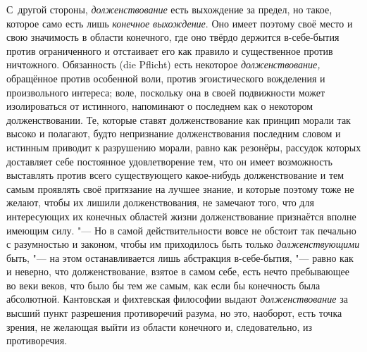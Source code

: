 С~другой стороны, {\em долженствование} есть выхождение
за предел, но такое, которое само есть лишь
{\em конечное выхождение}. Оно имеет поэтому своё место
и свою значимость в области конечного, где оно твёрдо держится в-себе-бытия
против ограниченного и отстаивает его как правило и существенное против
ничтожного. Обязанность (die Pflicht) есть некоторое
{\em долженствование,} обращённое против особенной
воли, против эгоистического вожделения и произвольного интереса; воле,
поскольку она в своей подвижности может изолироваться от истинного,
напоминают о последнем как о некотором долженствовании. Те, которые ставят
долженствование как принцип морали так высоко и полагают, будто непризнание
долженствования последним словом и истинным приводит к разрушению морали,
равно как резонёры, рассудок которых доставляет себе постоянное
удовлетворение тем, что он имеет возможность выставлять против всего
существующего какое-нибудь долженствование и тем самым проявлять своё
притязание на лучшее знание, и которые поэтому тоже не желают, чтобы их лишили
долженствования, не замечают того, что для интересующих их конечных
областей жизни долженствование признаётся вполне имеющим силу. "--- Но в самой
действительности вовсе не обстоит так печально с разумностью и законом,
чтобы им приходилось быть только {\em долженствующими}
быть, "--- на этом останавливается лишь абстракция в-себе-бытия, "--- равно как и
неверно, что долженствование, взятое в самом себе, есть нечто пребывающее
во веки веков, что было бы тем же самым, как если бы конечность была
абсолютной. Кантовская и фихтевская философии выдают
{\em долженствование} за высший пункт разрешения
противоречий разума, но это, наоборот, есть точка зрения, не желающая выйти
из области конечного и, следовательно, из противоречия.


